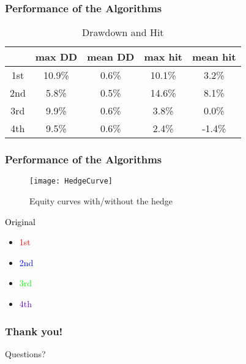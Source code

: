 \documentclass{beamer}
\begin{document}
\begin{frame}
  \frametitle{Performance of the Algorithms}
  \begin{table}[htb!]
    \centering
    \begin{tabular}{|c|c|c|c|c|}
      \hline
      & max DD & mean DD & max hit & mean hit \\
      \hline
      1st & 10.9\% &  0.6\% &  10.1\% &  3.2\% \\
      \hline
      2nd & 5.8\% &   0.5\% &  14.6\% &  8.1\% \\
      \hline
      3rd & 9.9\% &   0.6\% &  3.8\% &   0.0\% \\
      \hline
      4th & 9.5\% &   0.6\% &  2.4\% &  -1.4\% \\
      \hline
    \end{tabular}
    \caption{Drawdown and Hit}
    \label{tab:dd_hit}
  \end{table}
\end{frame}

\begin{frame}
  \frametitle{Performance of the Algorithms}
  \begin{minipage}{0.8\linewidth}
    \begin{figure}[htb!]
      \centering
      \texttt{[image: HedgeCurve]}
      \caption{Equity curves with/without the hedge}
      \label{fig:hedge_performance}
    \end{figure}
  \end{minipage}\hfill
  \begin{minipage}[t]{0.15\linewidth}
    \textcolor[HTML]{000000}{\small Original}
    \begin{itemize}
    \item \textcolor[HTML]{FF0000}{1st}
    \item \textcolor[HTML]{0000FF}{2nd}
    \item \textcolor[HTML]{00FF00}{3rd}
    \item \textcolor[HTML]{6600CC}{4th}
    \end{itemize}
  \end{minipage}
\end{frame}


\begin{frame}
   \frametitle{Thank you!}
   Questions?
 \end{frame}


\end{document}

